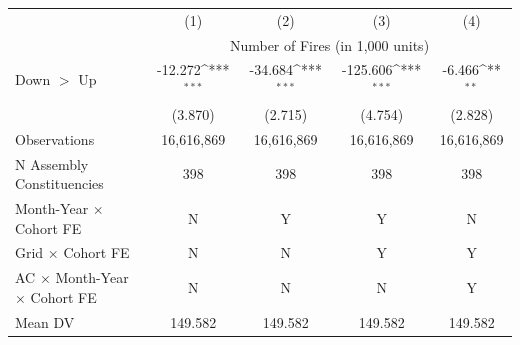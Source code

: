 {
\def\sym#1{\ifmmode^{#1}\else\(^{#1}\)\fi}
\begin{tabular}{l*{4}{c}}
\hline
            &\multicolumn{1}{c}{(1)}         &\multicolumn{1}{c}{(2)}         &\multicolumn{1}{c}{(3)}         &\multicolumn{1}{c}{(4)}             \\
            & \multicolumn{4}{c}{Number of Fires (in 1,000 units)} \\ \hline

Down $>$ Up &     -12.272\sym{***}&     -34.684\sym{***}&    -125.606\sym{***}&      -6.466\sym{**} \\
            &     (3.870)         &     (2.715)         &     (4.754)         &     (2.828)         \\
\hline
Observations&  16,616,869         &  16,616,869         &  16,616,869         &  16,616,869         \\
N Assembly Constituencies&         398         &         398         &         398         &         398         \\
Month-Year $\times$ Cohort FE&           N         &           Y         &           Y         &           N         \\
Grid $\times$ Cohort FE&           N         &           N         &           Y         &           Y         \\
AC $\times$ Month-Year $\times$ Cohort FE&           N         &           N         &           N         &           Y         \\
Mean DV     &     149.582         &     149.582         &     149.582         &     149.582         \\
\hline
\end{tabular}
}
